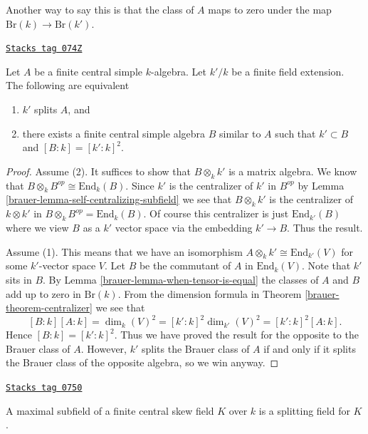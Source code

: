 Another way to say this is that the class of $A$ maps to zero
under the map $\text{Br}(k) \to \text{Br}(k')$.

\begin{theorem}[Splitting]
\label{brauer-theorem-splitting}
\href{https://stacks.math.columbia.edu/tag/074Z}{\texttt{Stacks tag 074Z}}

Let $A$ be a finite central simple $k$-algebra.
Let $k'/k$ be a finite field extension.
The following are equivalent
\begin{enumerate}
\item $k'$ splits $A$, and
\item there exists a finite central simple algebra $B$ similar to $A$
such that $k' \subset B$ and $[B : k] = [k' : k]^2$.
\end{enumerate}
\end{theorem}

\begin{proof}

Assume (2). It suffices to show that $B \otimes_k k'$ is a matrix
algebra. We know that $B \otimes_k B^{op} \cong \text{End}_k(B)$.
Since $k'$ is the centralizer of $k'$ in $B^{op}$ by
Lemma \ref{brauer-lemma-self-centralizing-subfield}
we see that $B \otimes_k k'$ is the centralizer of $k \otimes k'$
in $B \otimes_k B^{op} = \text{End}_k(B)$. Of course this centralizer
is just $\text{End}_{k'}(B)$ where we view $B$ as a $k'$ vector space
via the embedding $k' \to B$. Thus the result.

\medskip\noindent
Assume (1). This means that we have an isomorphism
$A \otimes_k k' \cong \text{End}_{k'}(V)$ for some $k'$-vector space $V$.
Let $B$ be the commutant of $A$ in $\text{End}_k(V)$. Note that
$k'$ sits in $B$. By
Lemma \ref{brauer-lemma-when-tensor-is-equal}
the classes of $A$ and $B$ add up to zero in $\text{Br}(k)$.
From the dimension formula in
Theorem \ref{brauer-theorem-centralizer}
we see that
$$
[B : k] [A : k] =
\dim_k(V)^2 =
[k' : k]^2 \dim_{k'}(V)^2 =
[k' : k]^2 [A : k].
$$
Hence $[B : k] = [k' : k]^2$. Thus we have proved the result for the
opposite to the Brauer class of $A$. However, $k'$ splits the Brauer
class of $A$ if and only if it splits
the Brauer class of the opposite algebra, so we win anyway.
\end{proof}

\begin{lemma}
\label{brauer-lemma-maximal-subfield-splits}
\href{https://stacks.math.columbia.edu/tag/0750}{\texttt{Stacks tag 0750}}

A maximal subfield of a finite central skew field $K$ over $k$ is
a splitting field for $K$.
\end{lemma}

